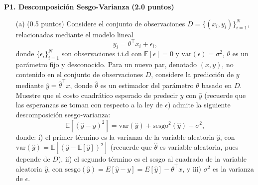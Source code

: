 \documentclass[11pt,letterpaper]{article}
\begin{document}
\noindent\textbf{P1. Descomposición Sesgo-Varianza} \textbf{(2.0 puntos)}
\vspace{5 mm}
\begin{itemize}
    \item[(a)] (0.5 puntos) Considere el conjunto de  observaciones  $D=\{(x_{i}, y_{i})\}_{i=1}^{N}$, relacionadas mediante el modelo lineal  
    	\begin{equation*}
    	    y_{i}=\theta^\top x_{i}+\epsilon_{i},
    	\end{equation*}
    	 donde $\{\epsilon_{i}\}_{i=1}^N$ son observaciones i.i.d con $\mathbb{E}[\epsilon]=0$ y $\text{var}(\epsilon)=\sigma^{2}$,  $\theta$ es un parámetro fijo y desconocido. Para un nuevo par, denotado $(x,y)$, no contenido en el conjunto de observaciones $D$, considere la predicción de $y$ mediante $\hat y=\hat\theta^\top x$, donde $\hat{\theta}$ es un estimador del  parámetro $\theta$ basado en $D$. Muestre que el costo cuadrático esperado de predecir $y$  con $\hat y$ (recuerde que las esperanzas se toman con   respecto a la ley de $\epsilon$) admite la siguiente  descomposición sesgo-varianza:
    	\begin{equation*}
    	    \mathbb{E}\left[(\hat{y}-y)^{2}\right] = \text{var}(\hat{y})+\text{sesgo}^{2}(\hat{y}) + \sigma^{2},
    	\end{equation*}
        donde: i) el primer término es la varianza de la variable aleatoria $\hat y$, con $\text{var}(\hat{y})=\mathbb{E}\left[(\hat{y}-\mathbb{E}[\hat{y}])^{2}\right]$ (recuerde que $\hat\theta$ es variable aleatoria, pues depende de $D$), ii) el segundo término es el sesgo al cuadrado de la variable aleatoria $\hat{y}$, con $\text{sesgo}(\hat{y})=E\left[\hat{y}-y\right]=E\left[\hat{y}\right]- \theta^\top x$, y  iii) $\sigma^2$ es la varianza de $\epsilon$.


\end{itemize}
\end{document}
